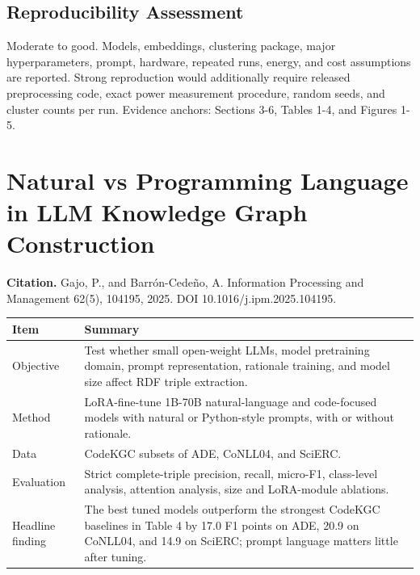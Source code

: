 \documentclass[11pt]{article}
\newcounter{none} %
\begin{document}
\subsection{Reproducibility
Assessment}\label{reproducibility-assessment-2}

Moderate to good. Models, embeddings, clustering package, major
hyperparameters, prompt, hardware, repeated runs, energy, and cost
assumptions are reported. Strong reproduction would additionally require
released preprocessing code, exact power measurement procedure, random
seeds, and cluster counts per run. Evidence anchors: Sections 3-6,
Tables 1-4, and Figures 1-5.

\clearpage
\section{Natural vs Programming Language in LLM Knowledge Graph
Construction}\label{natural-vs-programming-language-in-llm-knowledge-graph-construction}

\textbf{Citation.} Gajo, P., and Barrón-Cedeño, A. Information
Processing and Management 62(5), 104195, 2025. DOI
10.1016/j.ipm.2025.104195.

{\def\LTcaptype{none} %
\begin{longtable}[]{@{}
  >{\raggedright\arraybackslash}p{}
  >{\raggedright\arraybackslash}p{}@{}}
\toprule\noalign{}
\begin{minipage}[b]{\linewidth}\centering
\textbf{Item}
\end{minipage} & \begin{minipage}[b]{\linewidth}\centering
\textbf{Summary}
\end{minipage} \\
\midrule\noalign{}
\endhead
\bottomrule\noalign{}
\endlastfoot
Objective & Test whether small open-weight LLMs, model pretraining
domain, prompt representation, rationale training, and model size affect
RDF triple extraction. \\
Method & LoRA-fine-tune 1B-70B natural-language and code-focused models
with natural or Python-style prompts, with or without rationale. \\
Data & CodeKGC subsets of ADE, CoNLL04, and SciERC. \\
Evaluation & Strict complete-triple precision, recall, micro-F1,
class-level analysis, attention analysis, size and LoRA-module
ablations. \\
Headline finding & The best tuned models outperform the strongest
CodeKGC baselines in Table 4 by 17.0 F1 points on ADE, 20.9 on CoNLL04,
and 14.9 on SciERC; prompt language matters little after tuning. \\
\end{longtable}
}
\end{document}
